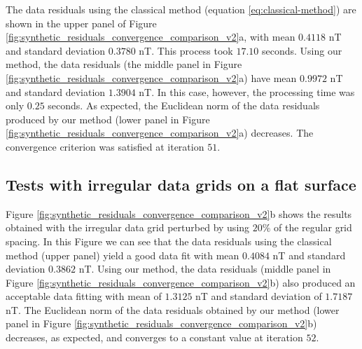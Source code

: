 \documentclass[manuscript,noblind]{geophysics}
\begin{document}
The data residuals using the classical method (equation \ref{eq:classical-method})  
are shown in the upper panel of Figure \ref{fig:synthetic_residuals_convergence_comparison_v2}a, 
with mean $0.4118$ nT and standard deviation $0.3780$ nT. This process took $17.10$ seconds.
Using our method, the data residuals (the middle panel in Figure
\ref{fig:synthetic_residuals_convergence_comparison_v2}a) have mean $0.9972$ nT and standard
deviation $1.3904$ nT. In this case, however, the processing time was only $0.25$ seconds.
As expected, the Euclidean norm of the data residuals produced by our method 
(lower panel in Figure \ref{fig:synthetic_residuals_convergence_comparison_v2}a) decreases. 
The convergence criterion was satisfied at iteration $51$.

\subsection*{Tests with irregular data grids on a flat surface}

Figure \ref{fig:synthetic_residuals_convergence_comparison_v2}b shows the results obtained
with the irregular data grid perturbed by using $20\%$ of the regular grid spacing.
In this Figure we can see that the data residuals 
using the classical method (upper panel) yield a good data fit with mean $0.4084$ nT and standard
deviation $0.3862$ nT. 
Using our method, the data residuals (middle panel in Figure 
\ref{fig:synthetic_residuals_convergence_comparison_v2}b) also produced an acceptable data 
fitting with mean of  $1.3125$ nT and standard deviation of $1.7187$ nT. 
The Euclidean norm of the data residuals obtained by our method 
(lower panel in Figure \ref{fig:synthetic_residuals_convergence_comparison_v2}b) decreases, 
as expected, and converges to a constant value at iteration $52$. 
\end{document}
